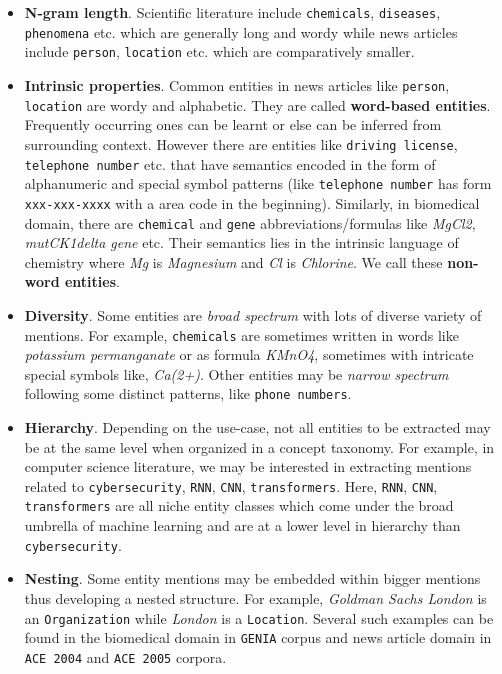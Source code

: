 \begin{itemize}
    \item \textbf{N-gram length}. Scientific literature include \texttt{chemicals}, \texttt{diseases}, \texttt{phenomena} etc. which are generally long and wordy while news articles include \texttt{person}, \texttt{location} etc. which are comparatively smaller. 
    
    \item \textbf{Intrinsic properties}. Common entities in news articles like \texttt{person}, \texttt{location} are wordy and alphabetic. They are called \textbf{word-based entities}. Frequently occurring ones can be learnt or else can be inferred from surrounding context. However there are entities like \texttt{driving license}, \texttt{telephone number} etc. that have semantics encoded in the form of alphanumeric and special symbol patterns (like \texttt{telephone number} has form \texttt{xxx-xxx-xxxx} with a area code in the beginning). Similarly, in biomedical domain, there are \texttt{chemical} and \texttt{gene} abbreviations/formulas like \textit{MgCl2}, \textit{mutCK1delta gene} etc. Their semantics lies in the intrinsic language of chemistry where \textit{Mg} is \textit{Magnesium} and \textit{Cl} is \textit{Chlorine}. We call these \textbf{non-word entities}.
    
    \item \textbf{Diversity}. Some entities are \textit{broad spectrum} with lots of diverse variety of mentions. For example, \texttt{chemicals} are sometimes written in words like \textit{potassium permanganate} or as formula \textit{KMnO4}, sometimes with intricate special symbols like, \textit{Ca(2+)}. Other entities may be \textit{narrow spectrum} following some distinct patterns, like \texttt{phone numbers}. 
    
    \item \textbf{Hierarchy}. Depending on the use-case, not all entities to be extracted may be at the same level when organized in a concept taxonomy. For example, in computer science literature, we may be interested in extracting mentions related to \texttt{cybersecurity}, \texttt{RNN}, \texttt{CNN}, \texttt{transformers}. Here, \texttt{RNN}, \texttt{CNN}, \texttt{transformers} are all niche entity classes which come under the broad umbrella of machine learning and are at a lower level in hierarchy than \texttt{cybersecurity}.
    
    \item \textbf{Nesting}. Some entity mentions may be embedded within bigger mentions thus developing a nested structure. For example, \textit{Goldman Sachs London} is an \texttt{Organization} while \textit{London} is a \texttt{Location}. Several such examples can be found in the biomedical domain in \texttt{GENIA} corpus\cite{kim2003genia} and news article domain in \texttt{ACE 2004}\cite{mitchell2005ace} and \texttt{ACE 2005}\cite{walker2006ace} corpora.
    

\end{itemize}
